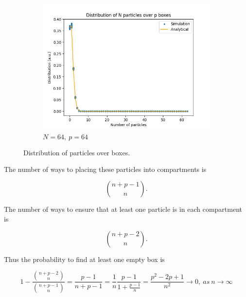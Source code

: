 \documentclass{assignmeownt}
\begin{document}
\begin{figure}
     \begin{subfigure}[b]{0.5\textwidth}
         \centering
         \includegraphics[width=\linewidth]{../block1/1-DistributionOfParticles/Results/64_64.png}
         \caption{$N=64,\ p=64$}
     \end{subfigure}
        \caption{Distribution of particles over boxes.}
        \label{fig:three graphs}
\end{figure}

The number of ways to placing these particles into compartments is

$${n+p-1\choose n}.$$

The number of ways to ensure that at least one particle is in each compartment is

$${n+p-2\choose n}.$$

Thus the probability to find at least one empty box is

$$1-\frac{{n+p-2\choose n}}{{n+p-1\choose n}}=\frac{p-1}{n+p-1}=\frac{1}{n}\frac{p-1}{1+\frac{p-1}{n}}=\frac{p^2-2p+1}{n^2} \rightarrow 0,\ as\ n\rightarrow \infty$$

\bigskip

\end{document}
